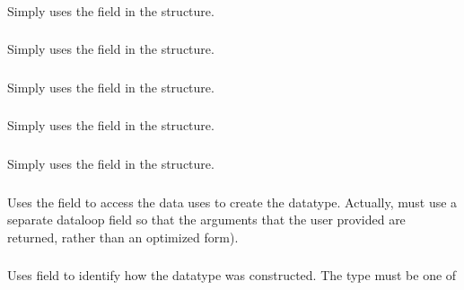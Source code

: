 \documentclass{article}
\begin{document}
\subsubsection{}
Simply uses the  field in the structure.

\subsubsection{}
Simply uses the  field in the structure.

\subsubsection{}
Simply uses the  field in the structure.

\subsubsection{}
Simply uses the  field in the structure.

\subsubsection{}
Simply uses the  field in the structure.

\subsubsection{}
Uses the  field to access the data uses to create the datatype.
Actually, must use a separate dataloop field so that the arguments that the
user provided are returned, rather than an optimized form).

\subsubsection{}
Uses  field to identify how the datatype was constructed.
The  type must be one of 
\end{document}
